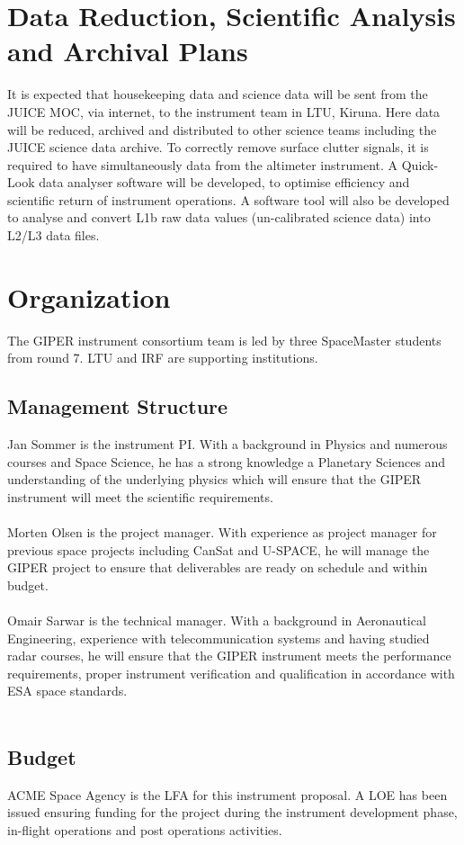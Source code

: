 \section{Data Reduction, Scientific Analysis and Archival Plans}
%
It is expected that housekeeping data and science data will be sent from the JUICE \ac{MOC}, via internet, to the instrument team in LTU, Kiruna. Here data will be reduced, archived and distributed to other science teams including the JUICE science data archive. To correctly remove surface clutter signals, it is required to have simultaneously data from the altimeter instrument. 
%
A Quick-Look data analyser software will be developed, to optimise efficiency and scientific return of instrument operations.
%
A software tool will also be developed to analyse and convert L1b raw data values (un-calibrated science data) into L2/L3 data files.
%
\section{Organization}
%
The \ac{GIPER} instrument consortium team is led by three SpaceMaster students from round 7. LTU and \ac{IRF} are supporting institutions.
%
\subsection{Management Structure}
%
\noindent
Jan Sommer is the instrument \ac{PI}. With a background in Physics and numerous courses and Space Science, he has a strong knowledge a Planetary Sciences and understanding of the underlying physics which will ensure that the \ac{GIPER} instrument will meet the scientific requirements.\\\\
%
\noindent
Morten Olsen is the project manager. With experience as project manager for previous space projects including CanSat and U-SPACE, he will manage the \ac{GIPER} project to ensure that deliverables are ready on schedule and within budget.\\\\
%
\noindent
Omair Sarwar is the technical manager. With a background in Aeronautical Engineering, experience with telecommunication systems and having studied radar courses, he will ensure that the \ac{GIPER} instrument meets the performance requirements, proper instrument verification and qualification in accordance with ESA space standards.\\\\
%
\subsection{Budget}
ACME Space Agency is the \ac{LFA} for this instrument proposal. A \ac{LOE} has been issued ensuring funding for the project during the instrument development phase, in-flight operations and post operations activities.